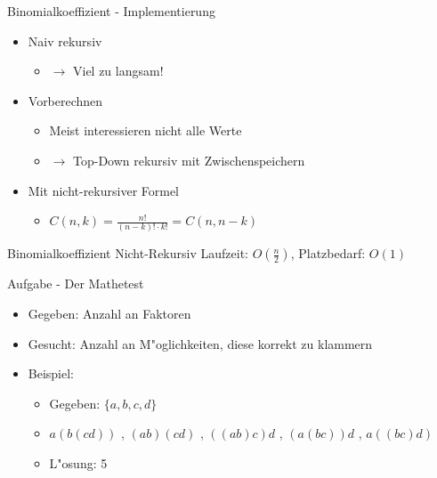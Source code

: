 \documentclass[18pt]{beamer}
\begin{document}
\begin{frame}{Binomialkoeffizient - Implementierung}
\begin{itemize}
\item Naiv rekursiv
\begin{itemize}
\item $\rightarrow$ Viel zu langsam!
\end{itemize}
\item Vorberechnen
\begin{itemize}
\item Meist interessieren nicht alle Werte
\item $\rightarrow$ Top-Down rekursiv mit Zwischenspeichern
\end{itemize}
\item Mit nicht-rekursiver Formel
\begin{itemize}
\item $C\left( n,k \right) = \frac{n!}{\left( n-k \right) ! \cdot k!} = C\left( n, n -k \right)$
\end{itemize}
\end{itemize}
\end{frame}

\begin{frame} {Binomialkoeffizient Nicht-Rekursiv}
Laufzeit: $O \left( \frac{n}{2} \right)$, Platzbedarf: $O \left( 1 \right)$
\end{frame}

\begin{frame}{Aufgabe - Der Mathetest}
\begin{itemize}
\item Gegeben: Anzahl an Faktoren
\item Gesucht: Anzahl an M"oglichkeiten, diese korrekt zu klammern
\item Beispiel:
\begin{itemize}
\item Gegeben: $\lbrace a, b, c, d \rbrace$
\item $ a \left( b \left( c d \right) \right) $ , $\left( a b \right) \left( c d \right) $ , $\left( \left( a b \right) c \right) d$ , $\left( a \left( b  c \right) \right) d $ , $ a \left( \left( b  c \right) d \right) $
\item L"osung: 5
\end{itemize}
\end{itemize}
\end{frame}
\end{document}

